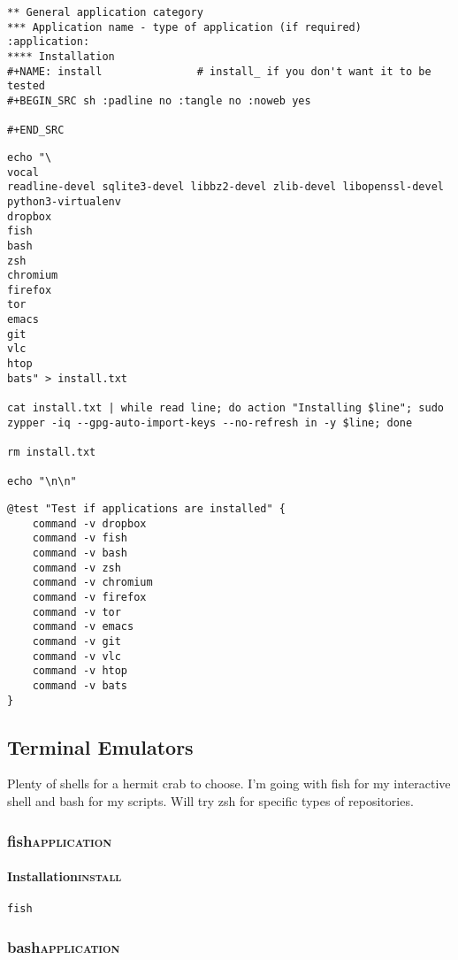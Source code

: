 \documentclass[11pt]{article}
\begin{document}
\begin{verbatim}
** General application category
*** Application name - type of application (if required)        :application:
**** Installation
#+NAME: install               # install_ if you don't want it to be tested
#+BEGIN_SRC sh :padline no :tangle no :noweb yes

#+END_SRC
\end{verbatim}

\begin{verbatim}
echo "\
vocal
readline-devel sqlite3-devel libbz2-devel zlib-devel libopenssl-devel
python3-virtualenv
dropbox
fish
bash
zsh
chromium
firefox
tor
emacs
git
vlc
htop
bats" > install.txt

cat install.txt | while read line; do action "Installing $line"; sudo zypper -iq --gpg-auto-import-keys --no-refresh in -y $line; done

rm install.txt

echo "\n\n"
\end{verbatim}

\begin{verbatim}
@test "Test if applications are installed" {
    command -v dropbox
    command -v fish
    command -v bash
    command -v zsh
    command -v chromium
    command -v firefox
    command -v tor
    command -v emacs
    command -v git
    command -v vlc
    command -v htop
    command -v bats
}
\end{verbatim}

\subsection{Terminal Emulators}
\label{sec:org4708ac2}
Plenty of shells for a hermit crab to choose. I'm going with fish for my interactive shell and bash for my scripts. Will try zsh for specific types of repositories.
\subsubsection{fish\hfill{}\textsc{application}}
\label{sec:orgba558dd}
\paragraph{Installation\hfill{}\textsc{install}}
\label{sec:orgae8a345}
\begin{verbatim}
fish
\end{verbatim}

\subsubsection{bash\hfill{}\textsc{application}}
\label{sec:orgc4ac1ce}
\end{document}
